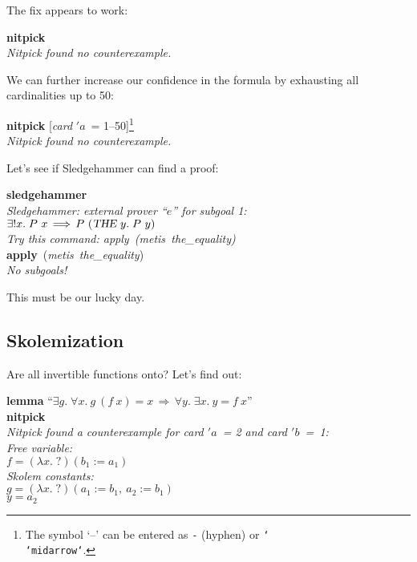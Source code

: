 \documentclass[a4paper,12pt]{article}
\def\unk{{?}}
\def\undef{(\lambda x.\; \unk)}
\begin{document}
The fix appears to work:

\prew
\textbf{nitpick} \\[2\smallskipamount]
\slshape Nitpick found no counterexample.
\postw

We can further increase our confidence in the formula by exhausting all
cardinalities up to 50:

\prew
\textbf{nitpick} [\textit{card} $'a$~= 1--50]\footnote{The symbol `--'
can be entered as \texttt{-} (hyphen) or
\texttt{\char`\\\char`\<midarrow\char`\>}.} \\[2\smallskipamount]
\slshape Nitpick found no counterexample.
\postw

Let's see if Sledgehammer can find a proof:

\prew
\textbf{sledgehammer} \\[2\smallskipamount]
{\slshape Sledgehammer: external prover ``$e$'' for subgoal 1: \\
$\exists{!}x.\; P~x\,\Longrightarrow\, P~(\hbox{\slshape THE}~y.\; P~y)$ \\
Try this command: \textrm{apply}~(\textit{metis~the\_equality})} \\[2\smallskipamount]
\textbf{apply}~(\textit{metis~the\_equality\/}) \nopagebreak \\[2\smallskipamount]
{\slshape No subgoals!}%
\postw

This must be our lucky day.

\subsection{Skolemization}
\label{skolemization}

Are all invertible functions onto? Let's find out:

\prew
\textbf{lemma} ``$\exists g.\; \forall x.~g~(f~x) = x
 \,\Longrightarrow\, \forall y.\; \exists x.~y = f~x$'' \\
\textbf{nitpick} \\[2\smallskipamount]
\slshape
Nitpick found a counterexample for \textit{card} $'a$~= 2 and \textit{card} $'b$~=~1: \\[2\smallskipamount]
\hbox{}\qquad Free variable: \nopagebreak \\
\hbox{}\qquad\qquad $f = \undef{}(b_1 := a_1)$ \\
\hbox{}\qquad Skolem constants: \nopagebreak \\
\hbox{}\qquad\qquad $g = \undef{}(a_1 := b_1,\> a_2 := b_1)$ \\
\hbox{}\qquad\qquad $y = a_2$
\postw
\end{document}
